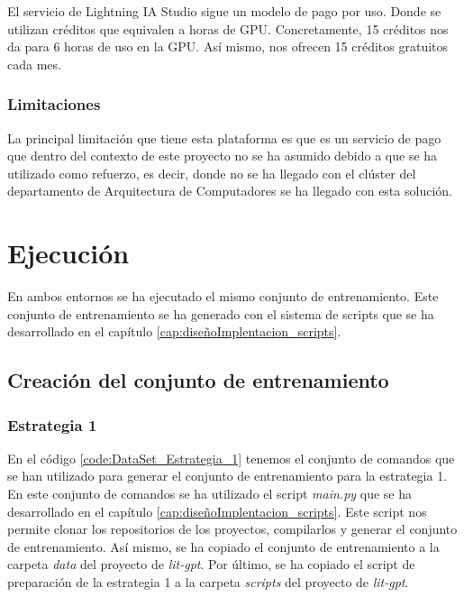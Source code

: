 El servicio de Lightning IA Studio sigue un modelo de pago por uso. Donde se utilizan
créditos que equivalen a horas de GPU. Concretamente, 15 créditos nos da para 6 horas de
uso en la GPU. Así mismo, nos ofrecen 15 créditos gratuitos cada mes. \cite{lightningiaPricing}

\subsubsection{Limitaciones}
\label{subsubsec:limitaciones}


La principal limitación que tiene esta plataforma es que es un servicio de pago que dentro
del contexto de este proyecto no se ha asumido debido a que se ha utilizado como refuerzo, es
decir, donde no se ha llegado con el clúster del departamento de Arquitectura de Computadores
se ha llegado con esta solución.

\section{Ejecución}
\label{sec:ejecucion}

En ambos entornos se ha ejecutado el mismo conjunto de entrenamiento. Este conjunto de
entrenamiento se ha generado con el sistema de scripts que se ha desarrollado en el capítulo
\ref{cap:diseñoImplentacion_scripts}.

\subsection{Creación del conjunto de entrenamiento}
\label{subsec:creacion_conjunto_entrenamiento}

\subsubsection{Estrategia 1}
\label{subsubsec:creacion_conjunto:estrategia_1}

En el código \ref{code:DataSet_Estrategia_1} tenemos el conjunto de comandos que se han
utilizado para generar el conjunto de entrenamiento para la estrategia 1. En este conjunto
de comandos se ha utilizado el script \textit{main.py} que se ha desarrollado en el capítulo
\ref{cap:diseñoImplentacion_scripts}. Este script nos permite clonar los repositorios de
los proyectos, compilarlos y generar el conjunto de entrenamiento. Así mismo, se ha copiado
el conjunto de entrenamiento a la carpeta \textit{data} del proyecto de \textit{lit-gpt}.
Por último, se ha copiado el script de preparación de la estrategia 1 a la carpeta \textit{scripts}
del proyecto de \textit{lit-gpt}.

